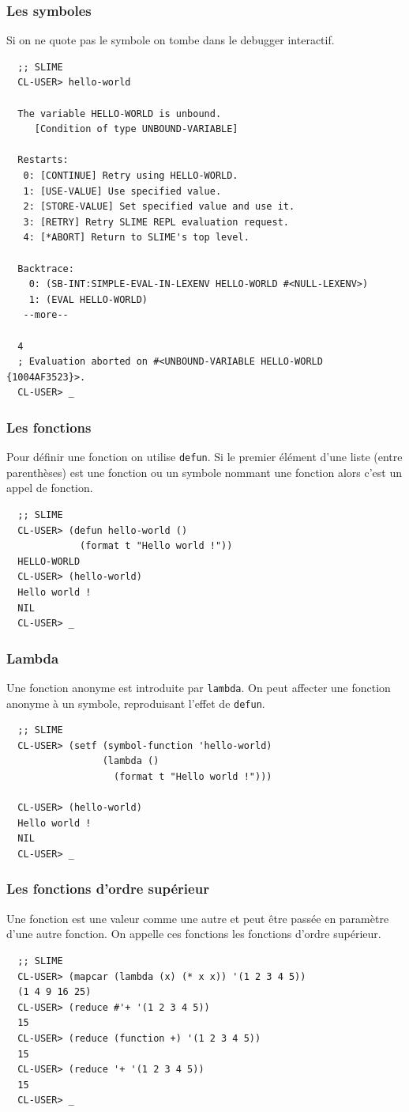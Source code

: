 \documentclass[8pt]{beamer}
\begin{document}
\begin{frame}[fragile]
  \frametitle{Les symboles}
  Si on ne quote pas le symbole on tombe dans le debugger interactif.
\begin{verbatim}
  ;; SLIME
  CL-USER> hello-world

  The variable HELLO-WORLD is unbound.
     [Condition of type UNBOUND-VARIABLE]

  Restarts:
   0: [CONTINUE] Retry using HELLO-WORLD.
   1: [USE-VALUE] Use specified value.
   2: [STORE-VALUE] Set specified value and use it.
   3: [RETRY] Retry SLIME REPL evaluation request.
   4: [*ABORT] Return to SLIME's top level.
  
  Backtrace:
    0: (SB-INT:SIMPLE-EVAL-IN-LEXENV HELLO-WORLD #<NULL-LEXENV>)
    1: (EVAL HELLO-WORLD)
   --more--

  4
  ; Evaluation aborted on #<UNBOUND-VARIABLE HELLO-WORLD {1004AF3523}>.
  CL-USER> _
\end{verbatim}
\end{frame}

\begin{frame}[fragile]
  \frametitle{Les fonctions}
  Pour définir une fonction on utilise {\tt defun}.
  Si le premier élément d'une liste (entre parenthèses) est une fonction ou un symbole nommant une fonction alors c'est un appel de fonction.
\begin{verbatim}
  ;; SLIME
  CL-USER> (defun hello-world ()
             (format t "Hello world !"))
  HELLO-WORLD
  CL-USER> (hello-world)
  Hello world !
  NIL
  CL-USER> _
\end{verbatim}
\end{frame}

\begin{frame}[fragile]
  \frametitle{Lambda}
  Une fonction anonyme est introduite par {\tt lambda}. On peut affecter une fonction anonyme à un symbole, reproduisant l'effet de {\tt defun}.
\begin{verbatim}
  ;; SLIME
  CL-USER> (setf (symbol-function 'hello-world)
                 (lambda ()
                   (format t "Hello world !")))
  
  CL-USER> (hello-world)
  Hello world !
  NIL
  CL-USER> _
\end{verbatim}
\end{frame}

\begin{frame}[fragile]
  \frametitle{Les fonctions d'ordre supérieur}
  Une fonction est une valeur comme une autre et peut être passée en paramètre d'une autre fonction. On appelle ces fonctions les fonctions d'ordre supérieur.
\begin{verbatim}
  ;; SLIME
  CL-USER> (mapcar (lambda (x) (* x x)) '(1 2 3 4 5))
  (1 4 9 16 25)
  CL-USER> (reduce #'+ '(1 2 3 4 5))
  15
  CL-USER> (reduce (function +) '(1 2 3 4 5))
  15
  CL-USER> (reduce '+ '(1 2 3 4 5))
  15
  CL-USER> _
\end{verbatim}
\end{frame}
\end{document}
